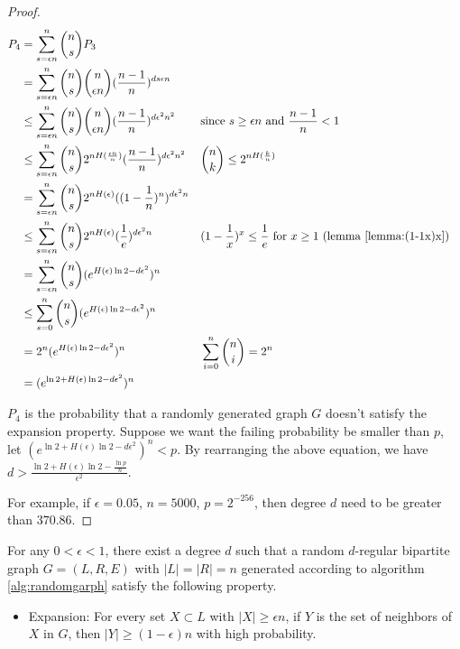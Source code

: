 \begin{proof}
\begin{align}
P_4 &= \sum_{s=\epsilon n}^{n} \binom{n}{s} P_3 \nonumber \\
    &= \sum_{s=\epsilon n}^{n} \binom{n}{s} \binom{n}{\epsilon n} (\frac{n-1}{n})^{d s \epsilon n} \nonumber \\
    &\le \sum_{s=\epsilon n}^{n} \binom{n}{s} \binom{n}{\epsilon n} (\frac{n-1}{n})^{d \epsilon^2 n^2} 
    && \text{since } s \ge \epsilon n \text{ and } \frac{n-1}{n} < 1 \nonumber \\
    &\le \sum_{s=\epsilon n}^{n} \binom{n}{s} 2^{n H(\frac{\epsilon n}{n})} (\frac{n-1}{n})^{d \epsilon^2 n^2} 
    && \binom{n}{k} \le 2^{n H(\frac{k}{n})} \nonumber \\
    &= \sum_{s=\epsilon n}^{n} \binom{n}{s} 2^{n H(\epsilon)} ((1 - \frac{1}{n})^{n})^{d \epsilon^2 n} \nonumber \\
    &\le \sum_{s=\epsilon n}^{n} \binom{n}{s} 2^{n H(\epsilon)} (\frac{1}{e})^{d \epsilon^2 n} 
    && (1 - \frac{1}{x})^x \le \frac{1}{e} \text{ for } x \ge 1 \text{ (lemma \ref{lemma:(1-1x)x})} \nonumber \\
    &= \sum_{s=\epsilon n}^{n} \binom{n}{s} (e^{ H(\epsilon) \ln 2  - d \epsilon^2})^n \nonumber \\
    &\le \sum_{s=0}^{n} \binom{n}{s} (e^{ H(\epsilon) \ln 2 - d \epsilon^2})^n \nonumber \\
    &= 2^n (e^{ H(\epsilon) \ln 2 - d \epsilon^2})^n 
    && \sum_{i=0}^n \binom{n}{i} = 2^n \nonumber \\
    &= (e^{\ln 2 + H(\epsilon) \ln 2 - d \epsilon^2})^n \nonumber \\
\end{align}

$P_4$ is the probability that a randomly generated graph $G$ doesn't satisfy the expansion property. Suppose we want the failing probability be smaller than $p$, let $(e^{\ln 2 + H(\epsilon) \ln 2 - d \epsilon^2})^n < p$.
By rearranging the above equation, we have $ d > \frac{\ln 2 + H(\epsilon) \ln 2 - \frac{\ln p}{n}}{\epsilon^2}$.

For example, if $\epsilon = 0.05$, $n = 5000$, $p = 2^{-256}$, then degree $d$ need to be greater than $370.86$.

\end{proof}


\begin{lemma}
\label{lemma:randomgraph2}

For any $0 < \epsilon < 1$, there exist a degree $d$ such that a random $d$-regular bipartite graph $G=(L, R, E)$ with $|L| = |R| = n$ generated according to algorithm \ref{alg:randomgarph} satisfy the following property.

    \begin{itemize}
        \item Expansion: For every set $X \subset L$ with $|X| \ge \epsilon n$, if $Y$ is the set of neighbors of $X$ in $G$, then $|Y| \ge (1 - \epsilon)  n$ with high probability.
    \end{itemize}

\end{lemma}


